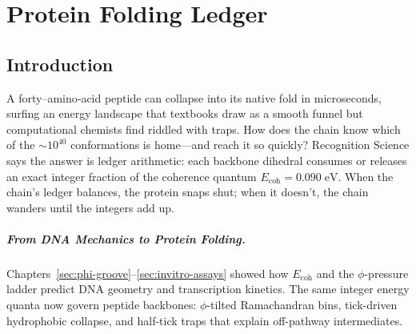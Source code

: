 \documentclass[11pt,oneside]{book}
\begin{document}
\bigskip

\chapter{Protein Folding Ledger}
\label{chap:protein-folding}

\section*{Introduction}


A forty–amino‐acid peptide can collapse into its native fold in
microseconds, surfing an energy landscape that textbooks draw as a smooth
funnel but computational chemists find riddled with traps.
How does the chain know which of the \(\sim10^{40}\) conformations is
home—and reach it so quickly?
Recognition Science says the answer is ledger arithmetic:
each backbone dihedral consumes or releases an exact integer fraction of
the coherence quantum \(E_{\text{coh}} = 0.090\;\text{eV}\).
When the chain’s ledger balances, the protein snaps shut; when it
doesn’t, the chain wanders until the integers add up.

\paragraph{From DNA Mechanics to Protein Folding.}
Chapters~\ref{sec:phi-groove}–\ref{sec:invitro-assays} showed how
\(E_{\text{coh}}\) and the \(\phi\)-pressure ladder
predict DNA geometry and transcription kinetics.
The same integer energy quanta now govern peptide backbones:
\(\phi\)-tilted Ramachandran bins, tick-driven hydrophobic collapse, and
half-tick traps that explain off-pathway intermediates.
\end{document}
